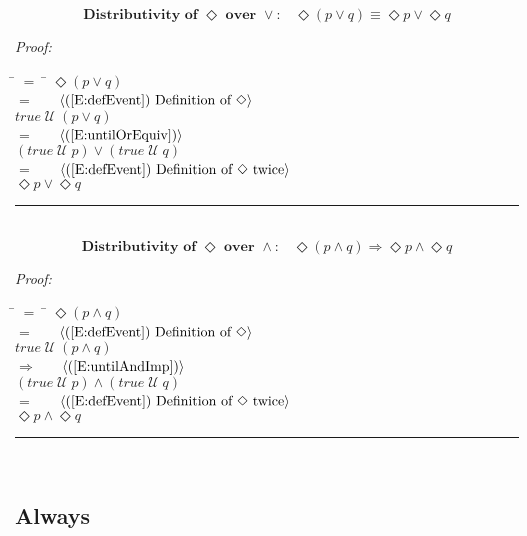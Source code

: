\documentclass[fleqn, leqno]{article}
\newcommand{\lgap}{2pt}                             %
\newcommand{\mymathindent}{24pt}                      %
\newcommand{\Until}{\;\mathcal{U}\;}
\newcommand{\Event}{\Diamond}
\newcommand{\myqed}{\hfill\rule[-.23ex]{1.2ex}{2.0ex}}
\newcommand{\Gll} {\langle}                         %
\newcommand{\Ggg} {\rangle}                         %
\newcommand{\Hint}[1]     {\ \ \ $\Gll              \mbox{#1} \Ggg$ }   %
\begin{document}
\begin{equation}\label{E:distEventOr}
\textbf{Distributivity of $\Event$ over $\lor$:}\quad \Event(p \lor q) \equiv \Event p \lor \Event q
\end{equation}

\emph{Proof:}
\begin{tabbing}
\hspace{\mymathindent} \= $= \;$ \= \kill
  \> \>   $\Event(p \lor q)$\\[\lgap]
  \> $=$  \>  \Hint{(\ref{E:defEvent}) Definition of $\Event$}\\[\lgap]
  \> \>   $true \Until (p \lor q)$\\[\lgap]
  \> $=$  \>  \Hint{(\ref{E:untilOrEquiv})}\\[\lgap]
  \> \>   $(true \Until p) \lor (true \Until q)$\\[\lgap]
  \> $=$  \>  \Hint{(\ref{E:defEvent}) Definition of $\Event$ twice}\\[\lgap]
  \> \>   $\Event p \lor \Event q$\\[\lgap]
\end{tabbing}
\myqed\\[\lgap]


\begin{equation}\label{E:distEventAnd}
\textbf{Distributivity of $\Event$ over $\land$:}\quad \Event(p \land q) \Rightarrow \Event p \land \Event q
\end{equation}

\emph{Proof:}
\begin{tabbing}
\hspace{\mymathindent} \= $= \;$ \= \kill
  \> \>   $\Event(p \land q)$\\[\lgap]
  \> $=$  \>  \Hint{(\ref{E:defEvent}) Definition of $\Event$}\\[\lgap]
  \> \>   $true \Until (p \land q)$\\[\lgap]
  \> $\Rightarrow$  \>  \Hint{(\ref{E:untilAndImp})}\\[\lgap]
  \> \>   $(true \Until p) \land (true \Until q)$\\[\lgap]
  \> $=$  \>  \Hint{(\ref{E:defEvent}) Definition of $\Event$ twice}\\[\lgap]
  \> \>   $\Event p \land \Event q$\\[\lgap]
\end{tabbing}
\myqed\\[\lgap]

\subsection{Always}
\end{document}
